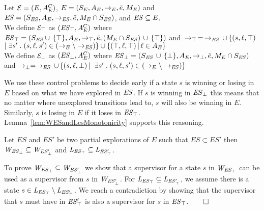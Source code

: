 \begin{definition}
 \label{def:unexploredTo}

Let $\mathcal{E} = (E, A_E^C)$, $E = (S_E,A_E,\rightarrow_E,\bar{e},M_E)$ and $\mathit{ES} = 
(S_{\mathit{ES}},A_E, \rightarrow_{\mathit{ES}},\bar{e},M_E \cap S_{\mathit{ES}})$, and $\mathit{ES} 
\subseteq E$.
\\
We define $\mathcal{E}_\top$ as $(\mathit{\mathit{ES}_{\top}}, A_E^C)$ where 
$\mathit{\mathit{ES}_{\top}} = (S_{\mathit{ES}} \cup \, \{\top\},A_E,\rightarrow_\top, 
\bar{e}, 
(M_E \cap S_{\mathit{ES}})\, \cup \, \{\top\})$ and $\, \rightarrow_\top \, = \, \rightarrow_{\mathit{ES}} 
\, 
\cup\, \{(s,\ell, \top) 
\;$ $ | \; \exists s' \;.\; (s, \ell, s') \in (\rightarrow_E \setminus \rightarrow_{\mathit{ES}})\} \cup \{(\top, \ell, \top) \, | \, \ell \in A_E\}$ \\
We define $\mathcal{E}_\bot$ as $(\mathit{\mathit{ES}_{\bot}}, A_E^C)$ where 
$\mathit{\mathit{ES}_{\bot}} = (S_{\mathit{ES}} \, \cup \, 
\{\bot\},A_E,\rightarrow_\bot, 
\bar{e}, M_E \cap S_{\mathit{ES}})$ and $\rightarrow_\bot = \rightarrow_{\mathit{ES}} \, \cup \, \{(s,\ell, 
\bot) \, | \, $ $ \exists s' \;.\; (s, \ell, s') \in (\rightarrow_E \setminus \rightarrow_{\mathit{ES}})\}$ 
\end{definition}

We use these control problems to decide early if a state $s$ is winning or losing in $E$ 
based on what we have explored in $\mathit{ES}$. If $s$ is winning in 
$\mathit{\mathit{ES}_{\bot}}$ this means that no matter where unexplored transitions 
lead to, $s$ will also be winning in $E$. Similarly, $s$ is losing in $E$ if it loses in  
$\mathit{\mathit{ES}_{\top}}$. Lemma~\ref{lem:WESandLesMonotonicity} supports this 
reasoning.




\begin{lemma}
\label{lem:WESandLesMonotonicity}
Let $ES$ and $ES'$ be two partial explorations of $E$ such that $ES 
\subset ES'$ then $\mathit{W_{\mathit{\mathit{ES}_{\bot}}}} \subseteq \mathit{W_{\mathit{\mathit{ES}'_{\bot}}}}$ and $\mathit{L_{\mathit{\mathit{ES}_{\top}}}} \subseteq 
\mathit{L_{\mathit{\mathit{ES}'_{\top}}}}$.
\end{lemma}

\begin{Proof Sketch}
To prove $\mathit{W_{\mathit{\mathit{ES}_{\bot}}}} \subseteq \mathit{W_{\mathit{\mathit{ES}'_{\bot}}}}$ we show that a supervisor for a 
state $s$ in $\mathit{W_{\mathit{\mathit{ES}_{\bot}}}}$ 
can be used as a supervisor from $s$ in $\mathit{W_{\mathit{\mathit{ES}'_{\bot}}}}$. For $\mathit{L_{\mathit{\mathit{ES}_{\top}}}} \subseteq 
\mathit{L_{\mathit{\mathit{ES}'_{\top}}}}$, we assume 
there is a state $s \in \mathit{L_{\mathit{\mathit{ES}_{\top}}}} \setminus \mathit{L_{\mathit{\mathit{ES}'_{\top}}}} $. We reach a 
contradiction by showing that the 
supervisor that $s$ must have in 
$\mathit{\mathit{ES}'_{\top}}$ is also a 
supervisor for $s$ in $\mathit{\mathit{ES}_{\top}}$.\hfill$\qed$
\end{Proof Sketch}

